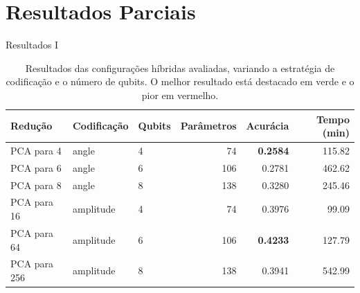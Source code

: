\section{Resultados Parciais}

\begin{frame}{Resultados I}
  \begin{table}[ht]
\centering
\small
\setlength{\tabcolsep}{6pt}
\renewcommand{\arraystretch}{1.15}

\begin{tabular}{lllrrr}
\toprule
Redução
& Codificação
& Qubits
& Parâmetros
& Acurácia
& Tempo (min) \\
\midrule

\rowcolor{red!20}
PCA para 4
& angle
& 4
& 74
& \textbf{0.2584}
& 115.82 \\

PCA para 6
& angle
& 6
& 106
& 0.2781
& 462.62 \\

PCA para 8
& angle
& 8
& 138
& 0.3280
& 245.46 \\

PCA para 16
& amplitude
& 4
& 74
& 0.3976
& 99.09 \\

\rowcolor{green!20}
PCA para 64
& amplitude
& 6
& 106
& \textbf{0.4233}
& 127.79 \\

PCA para 256
& amplitude
& 8
& 138
& 0.3941
& 542.99 \\

\bottomrule
\end{tabular}

\caption{
Resultados das configurações híbridas avaliadas, variando a estratégia
de codificação e o número de qubits. O melhor resultado está destacado
em verde e o pior em vermelho.
}
\label{tab:resultados_hibridos}
\end{table}
\end{frame}

